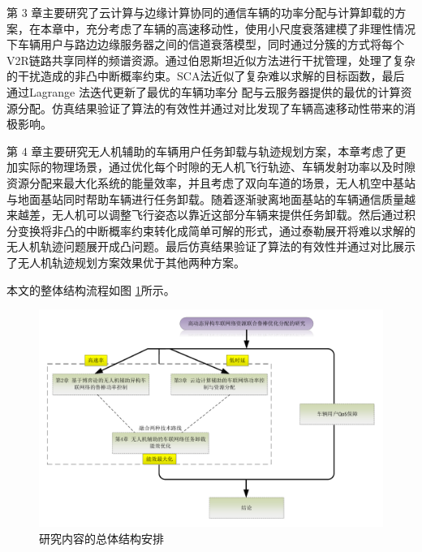 第 3 章主要研究了云计算与边缘计算协同的通信车辆的功率分配与计算卸载的方案，在本章中，充分考虑了车辆的高速移动性，使用小尺度衰落建模了非理性情况下车辆用户与路边边缘服务器之间的信道衰落模型，同时通过分簇的方式将每个V2R链路共享同样的频谱资源。通过伯恩斯坦近似方法进行干扰管理，处理了复杂的干扰造成的非凸中断概率约束。SCA法近似了复杂难以求解的目标函数，最后通过Lagrange 法迭代更新了最优的车辆功率分
配与云服务器提供的最优的计算资源分配。仿真结果验证了算法的有效性并通过对比发现了车辆高速移动性带来的消极影响。

第 4 章主要研究无人机辅助的车辆用户任务卸载与轨迹规划方案，本章考虑了更加实际的物理场景，通过优化每个时隙的无人机飞行轨迹、车辆发射功率以及时隙资源分配来最大化系统的能量效率，并且考虑了双向车道的场景，无人机空中基站与地面基站同时帮助车辆进行任务卸载。随着逐渐驶离地面基站的车辆通信质量越来越差，无人机可以调整飞行姿态以靠近这部分车辆来提供任务卸载。然后通过积分变换将非凸的中断概率约束转化成简单可解的形式，通过泰勒展开将难以求解的无人机轨迹问题展开成凸问题。最后仿真结果验证了算法的有效性并通过对比展示了无人机轨迹规划方案效果优于其他两种方案。

本文的整体结构流程如图 \ref{结构安排}所示。    %
\begin{figure}[H]
\centering
\includegraphics[width=16cm]{figures//chap1//总体结构安排2.pdf}
\caption{研究内容的总体结构安排}
\label{结构安排}
\end{figure}

